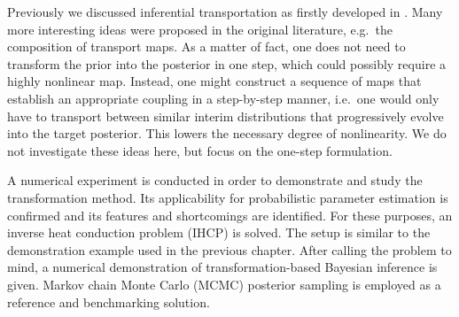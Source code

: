 Previously we discussed inferential transportation as firstly developed in \cite{Mapping:ElMoselhy2012,Mapping:Marzouk2016}.
Many more interesting ideas were proposed in the original literature, e.g.\ the composition of transport maps.
As a matter of fact, one does not need to transform the prior into the posterior in one step, which could possibly require a highly nonlinear map.
Instead, one might construct a sequence of maps that establish an appropriate coupling in a step-by-step manner,
i.e.\ one would only have to transport between similar interim distributions that progressively evolve into the target posterior.
This lowers the necessary degree of nonlinearity.
We do not investigate these ideas here, but focus on the one-step formulation.
\par %
A numerical experiment is conducted in order to demonstrate and study the transformation method.
Its applicability for probabilistic parameter estimation is confirmed and its features and shortcomings are identified.
For these purposes, an inverse heat conduction problem (IHCP) \cite{Inversion:Wang2004,Inversion:Kaipio2011} is solved.
The setup is similar to the demonstration example used in the previous chapter.
After calling the problem to mind, a numerical demonstration of transformation-based Bayesian inference is given.
Markov chain Monte Carlo (MCMC) posterior sampling is employed as a reference and benchmarking solution.

